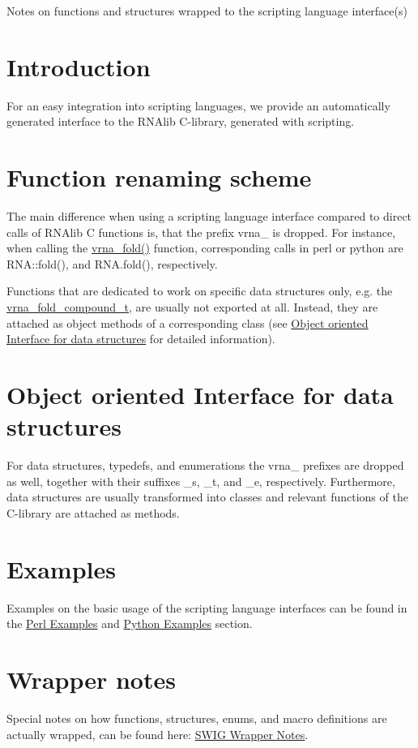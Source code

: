 Notes on functions and structures wrapped to the scripting language interface(s)\hypertarget{scripting_scripting_intro}{}\section{Introduction}\label{scripting_scripting_intro}
For an easy integration into scripting languages, we provide an automatically generated interface to the R\+N\+Alib C-\/library, generated with scripting.\hypertarget{scripting_scripting_renaming}{}\section{Function renaming scheme}\label{scripting_scripting_renaming}
The main difference when using a scripting language interface compared to direct calls of R\+N\+Alib C functions is, that the prefix \textquotesingle{}vrna\+\_\+\textquotesingle{} is dropped. For instance, when calling the \hyperlink{group__mfe__fold__single_ga29a33b2895f4e67b0480271ff289afdc}{vrna\+\_\+fold()} function, corresponding calls in perl or python are R\+N\+A\+::fold(), and R\+N\+A.\+fold(), respectively.

Functions that are dedicated to work on specific data structures only, e.\+g. the \hyperlink{group__fold__compound_ga1b0cef17fd40466cef5968eaeeff6166}{vrna\+\_\+fold\+\_\+compound\+\_\+t}, are usually not exported at all. Instead, they are attached as object methods of a corresponding class (see \hyperlink{scripting_scripting_oo_interface}{Object oriented Interface for data structures} for detailed information).\hypertarget{scripting_scripting_oo_interface}{}\section{Object oriented Interface for data structures}\label{scripting_scripting_oo_interface}
For data structures, typedefs, and enumerations the \textquotesingle{}vrna\+\_\+\textquotesingle{} prefixes are dropped as well, together with their suffixes \textquotesingle{}\+\_\+s\textquotesingle{}, \textquotesingle{}\+\_\+t\textquotesingle{}, and \textquotesingle{}\+\_\+e\textquotesingle{}, respectively. Furthermore, data structures are usually transformed into classes and relevant functions of the C-\/library are attached as methods.\hypertarget{scripting_scripting_examples}{}\section{Examples}\label{scripting_scripting_examples}
Examples on the basic usage of the scripting language interfaces can be found in the \hyperlink{mp_example_scripting_perl_examples}{Perl Examples} and \hyperlink{mp_example_scripting_python_examples}{Python Examples} section.\hypertarget{scripting_scripting_wrappers}{}\section{Wrapper notes}\label{scripting_scripting_wrappers}
Special notes on how functions, structures, enums, and macro definitions are actually wrapped, can be found here\+: \hyperlink{wrappers}{S\+W\+IG Wrapper Notes}. 